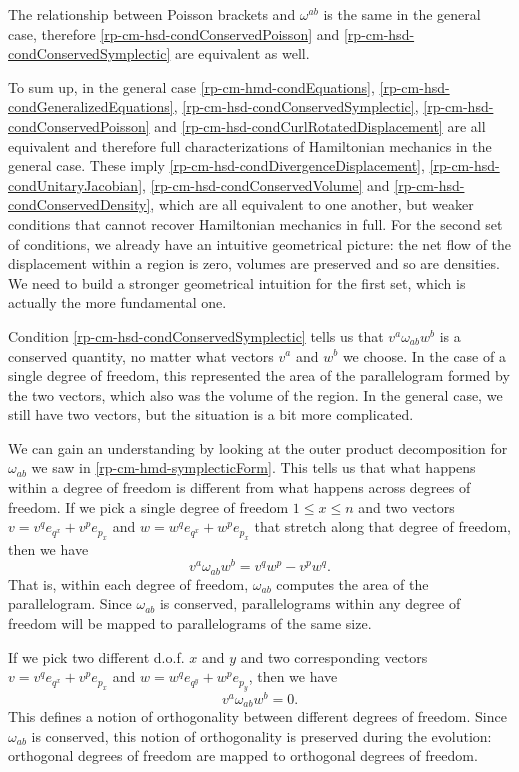 The relationship between Poisson brackets and $\omega^{ab}$ is the same in the general case, therefore \ref{rp-cm-hsd-condConservedPoisson} and \ref{rp-cm-hsd-condConservedSymplectic} are equivalent as well.

To sum up, in the general case \ref{rp-cm-hmd-condEquations}, \ref{rp-cm-hsd-condGeneralizedEquations}, \ref{rp-cm-hsd-condConservedSymplectic}, \ref{rp-cm-hsd-condConservedPoisson} and \ref{rp-cm-hsd-condCurlRotatedDisplacement} are all equivalent and therefore full characterizations of Hamiltonian mechanics in the general case. These imply \ref{rp-cm-hsd-condDivergenceDisplacement}, \ref{rp-cm-hsd-condUnitaryJacobian}, \ref{rp-cm-hsd-condConservedVolume} and \ref{rp-cm-hsd-condConservedDensity}, which are all equivalent to one another, but weaker conditions that cannot recover Hamiltonian mechanics in full. For the second set of conditions, we already have an intuitive geometrical picture: the net flow of the displacement within a region is zero, volumes are preserved and so are densities. We need to build a stronger geometrical intuition for the first set, which is actually the more fundamental one.

Condition \ref{rp-cm-hsd-condConservedSymplectic} tells us that $v^a \omega_{ab} w^b$ is a conserved quantity, no matter what vectors $v^a$ and $w^b$ we choose. In the case of a single degree of freedom, this represented the area of the parallelogram formed by the two vectors, which also was the volume of the region. In the general case, we still have two vectors, but the situation is a bit more complicated.

We can gain an understanding by looking at the outer product decomposition for $\omega_{ab}$ we saw in \ref{rp-cm-hmd-symplecticForm}. This tells us that what happens within a degree of freedom is different from what happens across degrees of freedom. If we pick a single degree of freedom $1 \leq x \leq n$ and two vectors $v = v^q e_{q^x} + v^p e_{p_x}$ and $w = w^q e_{q^x} + w^p e_{p_x}$ that stretch along that degree of freedom, then we have
\begin{equation}
	v^a \omega_{ab} w^b =  v^q w^p - v^p w^q.
\end{equation}
That is, within each degree of freedom, $\omega_{ab}$ computes the area of the parallelogram. Since $\omega_{ab}$ is conserved, parallelograms within any degree of freedom will be mapped to parallelograms of the same size.

If we pick two different d.o.f. $x$ and $y$ and two corresponding vectors $v = v^q e_{q^x} + v^p e_{p_x}$ and $w = w^q e_{q^y} + w^p e_{p_y}$, then we have
\begin{equation}
	v^a \omega_{ab} w^b =  0.
\end{equation}
This defines a notion of orthogonality between different degrees of freedom. Since $\omega_{ab}$ is conserved, this notion of orthogonality is preserved during the evolution: orthogonal degrees of freedom are mapped to orthogonal degrees of freedom.

